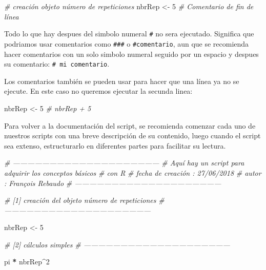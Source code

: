 \documentclass[
]{book}
\newenvironment{Shaded}{\begin{snugshade}}{\end{snugshade}}
\newcommand{\CommentTok}[1]{\textcolor[rgb]{0.56,0.35,0.01}{\textit{#1}}}
\newcommand{\DecValTok}[1]{\textcolor[rgb]{0.00,0.00,0.81}{#1}}
\newcommand{\NormalTok}[1]{#1}
\newcommand{\OperatorTok}[1]{\textcolor[rgb]{0.81,0.36,0.00}{\textbf{#1}}}
\newcommand{\StringTok}[1]{\textcolor[rgb]{0.31,0.60,0.02}{#1}}
\begin{document}
\begin{Shaded}
\begin{Highlighting}[]
\CommentTok{# creación objeto número de repeticiones}
\NormalTok{nbrRep <-}\StringTok{ }\DecValTok{5} \CommentTok{# Comentario de fin de línea}
\end{Highlighting}
\end{Shaded}

Todo lo que hay despues del simbolo numeral \texttt{\#} no sera ejecutado. Significa que podriamos usar comentarios como \texttt{\#\#\#} o \texttt{\#comentario}, aun que se recomienda hacer comentarios con un solo simbolo numeral seguido por un espacio y despues su comentario: \texttt{\#\ mi\ comentario}.

Los comentarios también se pueden usar para hacer que una línea ya no se ejecute. En este caso no queremos ejecutar la secunda linea:

\begin{Shaded}
\begin{Highlighting}[]
\NormalTok{nbrRep <-}\StringTok{ }\DecValTok{5}
\CommentTok{# nbrRep + 5}
\end{Highlighting}
\end{Shaded}

Para volver a la documentación del script, se recomienda comenzar cada uno de nuestros scripts con una breve descripción de su contenido, luego cuando el script sea extenso, estructurarlo en diferentes partes para facilitar su lectura.

\begin{Shaded}
\begin{Highlighting}[]
\CommentTok{# ------------------------------------------------------------}
\CommentTok{# Aquí hay un script para adquirir los conceptos básicos}
\CommentTok{# con R}
\CommentTok{# fecha de creación : 27/06/2018}
\CommentTok{# autor : François Rebaudo}
\CommentTok{# ------------------------------------------------------------}

\CommentTok{# [1] creación del objeto número de repeticiones}
\CommentTok{# ------------------------------------------------------------}

\NormalTok{nbrRep <-}\StringTok{ }\DecValTok{5}

\CommentTok{# [2] cálculos simples}
\CommentTok{# ------------------------------------------------------------}

\NormalTok{pi }\OperatorTok{*}\StringTok{ }\NormalTok{nbrRep}\OperatorTok{^}\DecValTok{2}
\end{Highlighting}
\end{Shaded}
\end{document}
